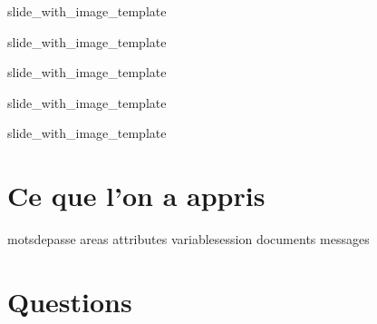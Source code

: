 \documentclass{beamer}
\begin{document}
\def\titlename{Team}
\def\imagepath{images/database/Team.png}
 {slide_with_image_template}

\def\titlename{Task}
\def\imagepath{images/database/Task.png}
 {slide_with_image_template}

\def\titlename{Event}
\def\imagepath{images/database/Event.png}
 {slide_with_image_template}

\def\titlename{Document}
\def\imagepath{images/database/Document.png}
 {slide_with_image_template}

\def\titlename{Message}
\def\imagepath{images/database/Message.png}
 {slide_with_image_template}

\section{Ce que l'on a appris}
 {motsdepasse}
 {areas}
 {attributes}
 {variablesession}
 {documents}
 {messages}



\section{Questions}

\end{document}
